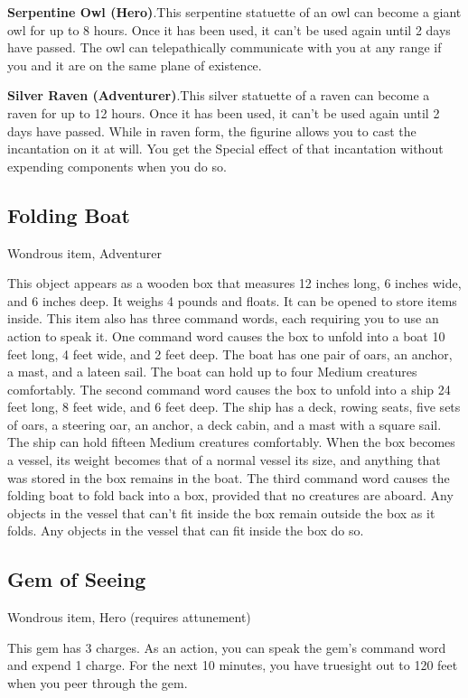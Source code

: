 \textbf{Serpentine Owl (Hero)}.This serpentine statuette of an owl can become a giant owl for up to 8 hours. Once it has been used, it can't be used again until 2 days have passed. The owl can telepathically communicate with you at any range if you and it are on the same plane of existence.

\textbf{Silver Raven (Adventurer)}.This silver statuette of a raven can become a raven for up to 12 hours. Once it has been used, it can't be used again until 2 days have passed. While in raven form, the figurine allows you to cast the  incantation on it at will. You get the Special effect of that incantation without expending components when you do so.

\subsection{Folding Boat}
Wondrous item, Adventurer 

This object appears as a wooden box that measures 12 inches long, 6 inches wide, and 6 inches deep. It weighs 4 pounds and floats. It can be opened to store items inside. This item also has three command words, each requiring you to use an action to speak it. One command word causes the box to unfold into a boat 10 feet long, 4 feet wide, and 2 feet deep. The boat has one pair of oars, an anchor, a mast, and a lateen sail. The boat can hold up to four Medium creatures comfortably.  The second command word causes the box to unfold into a ship 24 feet long, 8 feet wide, and 6 feet deep. The ship has a deck, rowing seats, five sets of oars, a steering oar, an anchor, a deck cabin, and a mast with a square sail. The ship can hold fifteen Medium creatures comfortably.  When the box becomes a vessel, its weight becomes that of a normal vessel its size, and anything that was stored in the box remains in the boat.  The third command word causes the folding boat to fold back into a box, provided that no creatures are aboard. Any objects in the vessel that can't fit inside the box remain outside the box as it folds. Any objects in the vessel that can fit inside the box do so.

\subsection{Gem of Seeing}
Wondrous item, Hero (requires attunement)

This gem has 3 charges. As an action, you can speak the gem's command word and expend 1 charge. For the next 10 minutes, you have truesight out to 120 feet when you peer through the gem.

